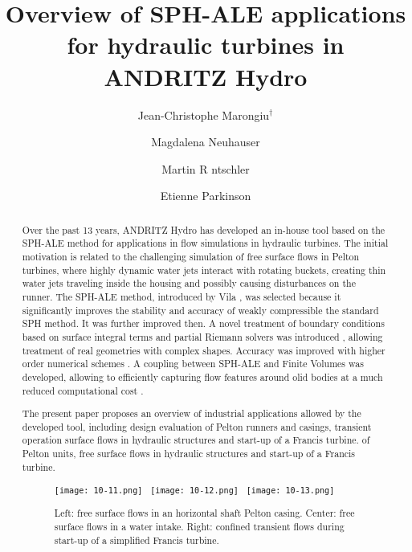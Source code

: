 \documentclass[10pt]{article}
\title{Overview of SPH-ALE applications for hydraulic turbines in ANDRITZ Hydro}
\date{}
\author[$\relax$]{Jean-Christophe Marongiu$^\dagger$}
\author[$\relax$]{Magdalena Neuhauser}
\author[$\relax$]{Martin R ntschler}
\author[$\relax$]{Etienne Parkinson}
\affil[$\relax$]{ANDRITZ Hydro R\&D, Switzerland}
\affil[$\relax$]{\email{\dagger}{jean-christophe.marongiu@andritz.com}}
\begin{document}
\maketitle


\begin{abstract}
Over the past 13 years, ANDRITZ Hydro has developed an in-house tool based on the SPH-ALE method for applications in flow simulations in hydraulic turbines. The initial motivation is related to the challenging simulation of free surface flows in Pelton turbines, where highly dynamic water jets interact with rotating buckets, creating thin water jets traveling inside the housing and possibly causing disturbances on the runner. The SPH-ALE method, introduced by Vila \cite{vila1999particle}, was selected because it significantly improves the stability and accuracy of weakly compressible the standard SPH method. It was further improved then. A novel treatment of boundary conditions based on surface integral terms and partial Riemann solvers was introduced \cite{marongiu2010free}, allowing treatment of real geometries with complex shapes. Accuracy was improved with higher order numerical schemes \cite{renaut2015high}. A coupling between SPH-ALE and Finite Volumes was developed, allowing to efficiently capturing flow features around olid bodies at a much reduced computational cost \cite{neuhauser2014coupling}. 

The present paper proposes an overview of industrial applications allowed by the developed tool, including design evaluation of Pelton runners and casings, transient operation surface flows in hydraulic structures and start-up of a Francis turbine. of Pelton units, free surface flows in hydraulic structures and start-up of a Francis turbine.
\begin{figure}[!htb]
\centering
\texttt{[image: 10-11.png]}~
\texttt{[image: 10-12.png]}~
\texttt{[image: 10-13.png]}
\caption{Left: free surface flows in an horizontal shaft Pelton casing. Center: free surface flows in a water intake. Right: confined transient flows during start-up of a simplified Francis turbine.}\label{fig:10}
\end{figure}

\end{abstract}



\addbib
\end{document}

